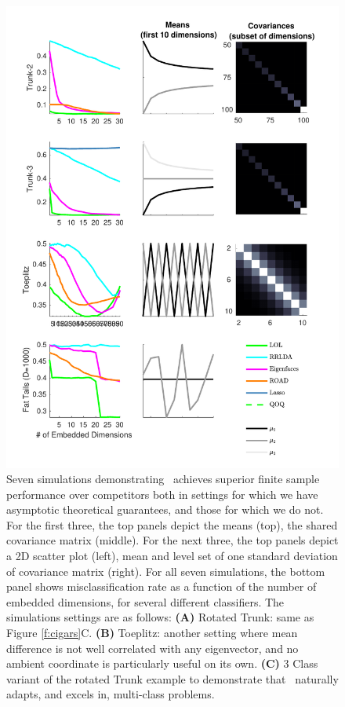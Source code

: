 \documentclass[10pt]{article}
\begin{document}
\begin{figure}
\centering
\includegraphics[width=0.8\linewidth]{../Figs/plot_sims}
\caption{
Seven simulations demonstrating \Lol~achieves superior finite sample performance over competitors both in settings for which we have asymptotic theoretical guarantees, and those for which we do not.
For the first three, the top panels depict the means (top), the shared covariance matrix (middle).  For the next three, the top panels depict a 2D scatter plot (left), mean and level set of one standard deviation of covariance matrix (right).  For all seven simulations, the bottom panel shows misclassification rate as a function of the number of embedded dimensions, for several different classifiers.  The simulations settings are as follows:
\textbf{(A)} Rotated Trunk: same as Figure \ref{f:cigars}C.
\textbf{(B)} Toeplitz: another setting where mean difference is not well correlated with any eigenvector, and no ambient coordinate is particularly useful on its own.
\textbf{(C)} 3 Class variant of the rotated Trunk example to demonstrate that \Lol~naturally adapts, and excels in, multi-class problems.
}
\end{figure}
\end{document}
